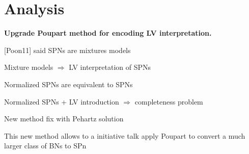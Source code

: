 \section{Analysis}
\label{sec:analysis}


{\bf Upgrade Poupart method for encoding LV interpretation.}

[Poon11] said SPNs are mixtures models

Mixture models $\Rightarrow$ LV interpretation of SPNs

Normalized SPNs are equivalent to SPNs

Normalized SPNs + LV introduction $\Rightarrow$ completeness problem

New method fix with Pehartz solution


This new method allows to a initiative talk apply Poupart to convert a much larger class of BNs to SPn